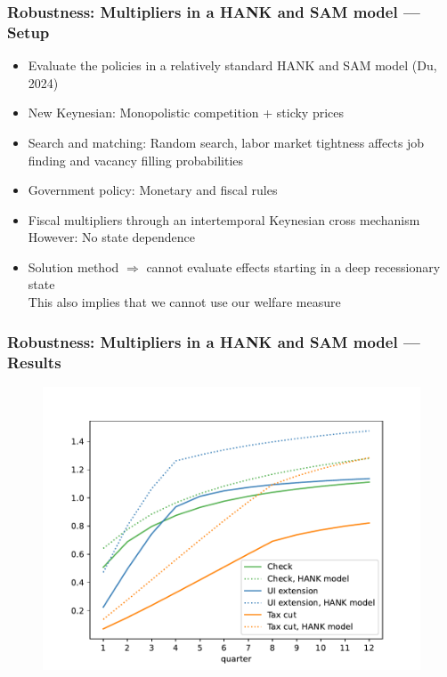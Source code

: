 \documentclass[pdflatex,aspectratio=169]{beamer}
\begin{document}
\begin{frame}
  \frametitle{Robustness: Multipliers in a HANK and SAM model --- Setup}
  \begin{itemize}
    \itemsep = .5\bigskipamount
    \item
          Evaluate the policies in a relatively standard HANK and SAM model (Du, 2024)
    \item
          New Keynesian: Monopolistic competition + sticky prices
    \item
          Search and matching: Random search, labor market tightness affects job finding and vacancy filling probabilities
    \item
          Government policy: Monetary and fiscal rules
    \item
          Fiscal multipliers through an intertemporal Keynesian cross mechanism \\[1ex]
          However: No state dependence
    \item
          Solution method $\Rightarrow$ cannot evaluate effects starting in a deep recessionary state \\[1ex]
          This also implies that we cannot use our welfare measure
  \end{itemize}
\end{frame}

\begin{frame}
  \frametitle{Robustness: Multipliers in a HANK and SAM model --- Results}
  \begin{figure}
    \begin{center}
      \includegraphics[scale=0.6]{Code/HA-Models/FromPandemicCode/Figures/Cumulative_multipliers_withHank}
    \end{center}
    \vspace{0.2cm}
  \end{figure}
\end{frame}
\end{document}
